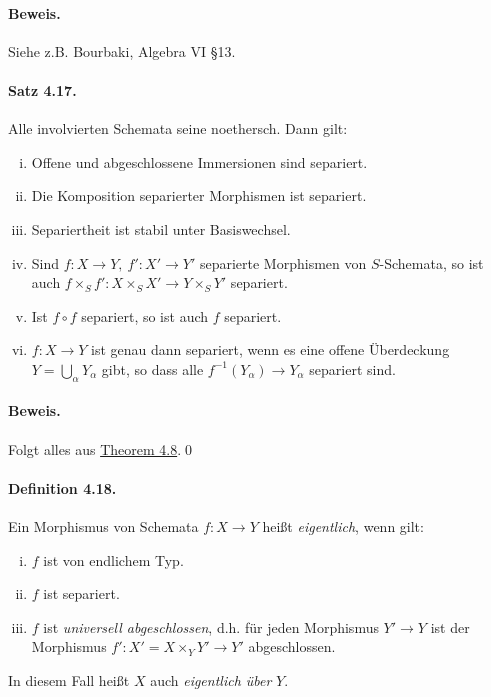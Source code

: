 \paragraph{Beweis.} Siehe z.B. Bourbaki, Algebra VI §13.

\paragraph{Satz 4.17.}\label{4.17} Alle involvierten Schemata seine noethersch. Dann gilt:
\begin{enumerate}[(i)]
\item Offene und abgeschlossene Immersionen sind separiert.
\item Die Komposition separierter Morphismen ist separiert.
\item Separiertheit ist stabil unter Basiswechsel.
\item Sind $f:X\to Y,\ f':X'\to Y'$ separierte Morphismen von $S$-Schemata, so ist auch $f\times_Sf':X\times_SX'\to Y\times_SY'$ separiert.
\item Ist $f\circ f$ separiert, so ist auch $f$ separiert.
\item $f:X\to Y$ ist genau dann separiert, wenn es eine offene Überdeckung $Y=\bigcup_\alpha Y_\alpha$ gibt, so dass alle $f^{-1}(Y_\alpha)\to Y_\alpha$ separiert sind.
\end{enumerate}

\paragraph{Beweis.} Folgt alles aus \hyperref[4.8]{Theorem 4.8}.\qed

\paragraph{Definition 4.18.}\label{4.18} Ein Morphismus von Schemata $f:X\to Y$ heißt \textit{eigentlich}, wenn gilt:
\begin{enumerate}[(i)]
\item $f$ ist von endlichem Typ.
\item $f$ ist separiert.
\item $f$ ist \textit{universell abgeschlossen}, d.h. für jeden Morphismus $Y'\to Y$ ist der Morphismus $f':X'=X\times_YY'\to Y'$ abgeschlossen.
\end{enumerate}
In diesem Fall heißt $X$ auch \textit{eigentlich über} $Y$.

